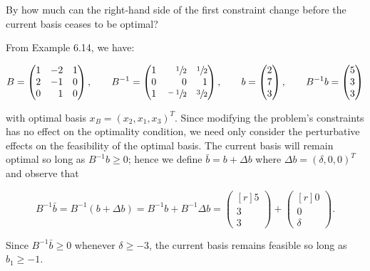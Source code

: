 By how much can the right-hand side of the first constraint change before the current basis ceases to be optimal?

\begin{solution}
  From Example 6.14, we have:

  $$
  B = \begin{pmatrix*}[r]
    1 & -2 & 1 \\
    2 & -1 & 0 \\
    0 &  1 & 0
  \end{pmatrix*}, \qquad B^{-1} = \begin{pmatrix*}[r]
    1 &  \sfrac{1}{2}  & \sfrac{1}{2} \\
    0 &             0  &            1 \\
    1 &  \sfrac{-1}{2} & \sfrac{3}{2} \\
  \end{pmatrix*}, \qquad b = \begin{pmatrix*}[r]
    2 \\
    7 \\
    3
  \end{pmatrix*}, \qquad B^{-1} b = \begin{pmatrix*}[r]
    5 \\
    3 \\
    3
  \end{pmatrix*}
  $$

  with optimal basis $x_B = \left( x_2, x_1, x_3 \right)^T$. Since modifying the problem's constraints has no effect on
  the optimality condition, we need only consider the perturbative effects on the feasibility of the optimal basis. The
  current basis will remain optimal so long as $B^{-1}b \ge 0$; hence we define $\bar{b} = b + \Delta b$ where 
  $\Delta b = (\delta, 0, 0)^T$ and observe that
  
  $$
  B^{-1}\bar{b} = B^{-1} \left( b + \Delta b \right) = B^{-1}b + B^{-1}\Delta b = \begin{pmatrix*}[r]
    5 \\
    3 \\
    3 
  \end{pmatrix*} + \begin{pmatrix*}[r]
    0 \\
    0 \\
    \delta
  \end{pmatrix*}.
  $$

  Since $B^{-1}\bar{b} \ge 0$ whenever $\delta \ge -3$, the current basis remains feasible so long as $b_1 \ge -1$.
  \ \\
\end{solution}
